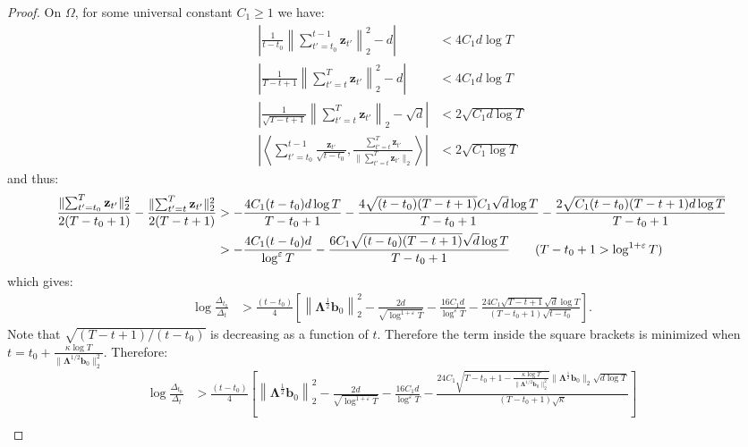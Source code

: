 \begin{proof}
On $\Omega$, for some universal constant $C_1 \geq 1$ we have:
\begin{align*}
    \left|\frac{1}{t-t_0}\left\lVert\sum_{t'=t_0}^{t-1}\mathbf{z}_{t'}\right\rVert_2^2 - d\right| &< 4C_1d\log T \\
    \left|\frac{1}{T-t+1}\left\lVert\sum_{t'=t}^T\mathbf{z}_{t'}\right\rVert_2^2 - d\right| &< 4C_1d\log T \\
    \left|\frac{1}{\sqrt{T-t+1}}\left\lVert\sum_{t'=t}^{T}\mathbf{z}_{t'}\right\rVert_2 -\sqrt{d}\right| &< 2\sqrt{C_1 d\log T}\\
    \left|\left\langle \sum_{t'=t_0}^{t-1}\frac{\mathbf{z}_{t'}}{\sqrt{t-t_0}}, \frac{\sum_{t'=t}^{T}\mathbf{z}_{t'}}{\lVert\sum_{t'=t}^{T}\mathbf{z}_{t'}\rVert_2}\right\rangle\right| &< 2\sqrt{C_1\log T}
\end{align*}
and thus:
\scriptsize
\begin{align*}
    \frac{\lVert\sum_{t'=t_0}^T\mathbf{z}_{t'}\rVert_2^2}{2(T-t_0+1)} - \frac{\lVert\sum_{t'=t}^T\mathbf{z}_{t'}\rVert_2^2}{2(T-t+1)} &> -\frac{4C_1(t-t_0)d\log T}{T-t_0+1} - \frac{4\sqrt{(t-t_0)(T-t+1)}C_1\sqrt{d}\log T}{T-t_0+1} - \frac{2\sqrt{C_1(t-t_0)(T-t+1)d\log T}}{T-t_0+1}\\
    &> -\frac{4C_1(t-t_0)d}{\log^{\varepsilon}T} - \frac{6C_1\sqrt{(t-t_0)(T-t+1)}\sqrt{d}\log T}{T-t_0+1} \tag{$T-t_0+1 > \log^{1+\varepsilon}T$}
\end{align*} 
\normalsize
which gives:
\begin{align*}
    \log \frac{\Delta_{t_0}}{\Delta_t} &> \frac{(t-t_0)}{4}\left[\left\lVert\boldsymbol{\Lambda}^{\frac{1}{2}}\mathbf{b}_0\right\rVert_2^2 - \frac{2d}{\sqrt{\log^{1+\varepsilon}  T}} - \frac{16C_1 d}{\log^{\varepsilon}T} - \frac{24C_1\sqrt{T-t+1}\sqrt{d}\log T}{(T-t_0+1)\sqrt{t-t_0}}\right].
\end{align*}
Note that $\sqrt{(T-t+1)/(t-t_0)}$ is decreasing as a function of $t$. Therefore the term inside the square brackets is minimized when $t = t_0 + \frac{\kappa\log T}{\lVert\boldsymbol{\Lambda}^{1/2}\mathbf{b}_0\rVert_2^2}$. Therefore:
\small
\begin{align*}
    \log \frac{\Delta_{t_0}}{\Delta_t} &> \frac{(t-t_0)}{4}\left[\left\lVert\boldsymbol{\Lambda}^{\frac{1}{2}}\mathbf{b}_0\right\rVert_2^2 - \frac{2d}{\sqrt{\log^{1+\varepsilon}  T}} - \frac{16C_1 d}{\log^{\varepsilon}T}  - \frac{24C_1\sqrt{T-t_0+1 - \frac{\kappa\log T}{\lVert\boldsymbol{\Lambda}^{1/2}\mathbf{b}_0\rVert_2^2}}\lVert\boldsymbol{\Lambda}^{\frac{1}{2}}\mathbf{b}_0\rVert_2\sqrt{d\log T}}{(T-t_0+1)\sqrt{\kappa}}\right] \\

\end{align*}
\end{proof}
